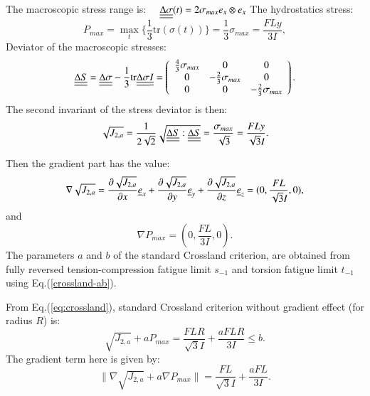 \documentclass[3p,times,procedia,number]{elsarticle}
\begin{document}
\noindent The macroscopic stress range is: $ \quad \uline{\uline{\Delta\sigma}}(t)=2\sigma_{max}e_x\otimes e_x $
The hydrostatics stress:
\begin{equation}
P_{max}=\max\limits_{t}\{\frac{1}{3}\textrm{tr}(\sigma(t))\}=\frac{1}{3}\sigma_{max}=\frac{FLy}{3I},
\end{equation}
Deviator of the macroscopic stresses:
\begin{equation} 
\uline{\uline{\Delta S}}=\uline{\uline{\Delta\sigma}}-\frac{1}{3}\textrm{tr}\uline{\uline{\Delta\sigma}}\uline{\uline{I}}=
\left(
\begin{array}{ccc}
\frac{4}{3}\sigma_{max} & 0 & 0\\
0 & -\frac{2}{3}\sigma_{max} & 0\\ 
0 & 0 & -\frac{2}{3}\sigma_{max}\\
\end{array}\right) .
\end{equation}
The second invariant of the stress deviator is then:
\begin{equation}
\sqrt{J_{2,a}}=\frac{1}{2\sqrt{2}}\sqrt{\uline{\uline{\Delta S}}:\uline{\uline{\Delta S}}}=\frac{\sigma_{max}}{\sqrt{3}} =\frac{FLy}{\sqrt{3}I} .
\end{equation}


Then the gradient part has the value:
\begin{equation}
\nabla\sqrt{J_{2,a}}=\frac{\partial\sqrt{J_{2,a}}}{\partial x}\uline{e}_x+\frac{\partial\sqrt{J_{2,a}}}{\partial y}\uline{e}_y+\frac{\partial\sqrt{J_{2,a}}}{\partial z}\uline{e}_z=(0,\frac{FL}{\sqrt{3}I},0) ,
\end{equation}
and
\begin{equation}
\nabla P_{max}=(0,\frac{FL}{3I},0).
\end{equation}
The parameters $a$ and $b$ of the standard Crossland criterion, are obtained from fully reversed tension-compression fatigue limit $s_{-1}$  and torsion fatigue limit $t_{-1}$ using Eq.(\ref{crossland-ab}).

From Eq.(\ref{eq:crossland}), standard Crossland criterion without gradient effect (for radius $R$) is:
\begin{equation}
\sqrt{J_{2,a}}+aP_{max}=\frac{FLR}{\sqrt{3}I} +\frac{aFLR}{3I}\leqslant b.
\label{eq4pcross}
\end{equation}
The gradient term here is given by:
\begin{equation}
\parallel{\nabla\sqrt{J_{2,a}}}+a{\nabla P_{max}}\parallel=\frac{FL}{\sqrt{3}I}+\frac{aFL}{3I}.
\label{cross-gradient-term}
\end{equation}
\end{document}
